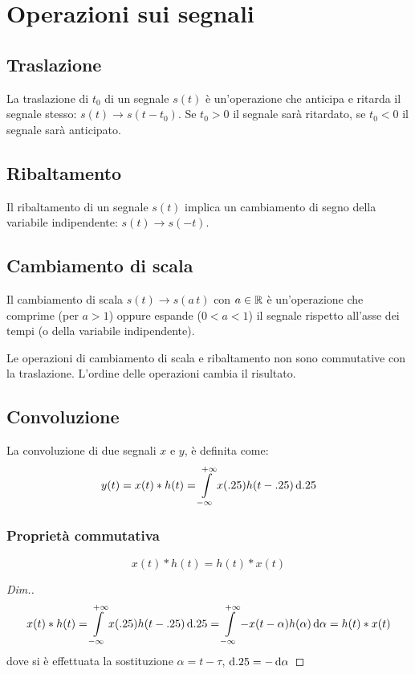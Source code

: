\section{Operazioni sui segnali}
\subsection{Traslazione}
La traslazione di $t_0$ di un segnale $s(t)$ è un'operazione che anticipa e ritarda il segnale stesso: 
$s(t) \to s(t-t_0)$. Se $t_0>0$ il segnale sarà ritardato, se $t_0<0$ il segnale sarà anticipato.
\subsection{Ribaltamento}
Il ribaltamento di un segnale $s(t)$ implica un cambiamento di segno della variabile indipendente: $s(t) \to s(-t)$.
\subsection{Cambiamento di scala}
Il cambiamento di scala $s(t)\to s(a\,t)$ con $a\in\mathbb{R}$ è un'operazione che comprime (per $a>1$) oppure espande ($0<a<1$) il segnale rispetto all'asse dei tempi (o della variabile indipendente).

\begin{nota}Le operazioni di cambiamento di scala e ribaltamento non sono commutative con la traslazione. L'ordine delle operazioni cambia il risultato.\end{nota}

\subsection{Convoluzione}
La convoluzione di due segnali $x$ e $y$, è definita come:
\begin{equation}\label{eq:convoluzione}
y(t)=x(t)\ast  h(t)=\int\limits_{-\infty}^{+\infty}{x(.25)h(t-.25)}{\,\mathop{}\!\mathrm{d}{.25}}
\end{equation}

\subsubsection{Proprietà commutativa}
\begin{equation}
x(t)\ast h(t)= h(t)\ast x(t)
\end{equation}
\begin{proof}[Dim.]
	\[x(t)\ast h(t)=\int\limits_{-\infty}^{+\infty}{x(.25)h(t-.25)}{\,\mathop{}\!\mathrm{d}{.25}}=\int\limits_{-\infty}^{+\infty}{-x(t-\alpha)h(\alpha)}{\,\mathop{}\!\mathrm{d}{\alpha}}=h(t)\ast x(t)\]
	dove si è effettuata la sostituzione $\alpha=t-\tau$, $\mathop{}\!\mathrm{d}.25=-\mathop{}\!\mathrm{d}\alpha$
\end{proof}
